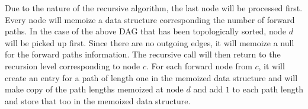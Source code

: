 \documentclass[addpoints]{exam}
\begin{document}
\begin{questions}
\begin{parts}
\begin{center}
\end{center}

Due to the nature of the recursive algorithm, the last node will be processed first. Every node will memoize a data structure corresponding the number of forward paths. In the case of the above DAG that has been topologically sorted, node $d$ will be picked up first. Since there are no outgoing edges, it will memoize a null for the forward paths information. The recursive call will then return to the recursion level corresponding to node $c$. For each forward node from $c$, it will create an entry for a path of length one in the memoized data structure and will make copy of the path lengths memoized at node $d$ and add $1$ to each path length and store that too in the memoized data structure. \\


\end{parts}
\end{questions}
\end{document}
